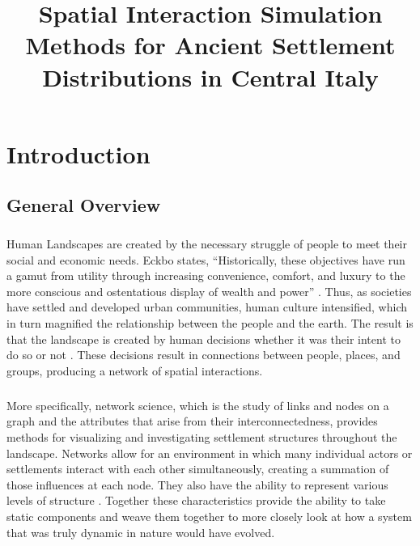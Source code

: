 \documentclass[12pt,a4paper]{thesis}
\begin{document}
\title{Spatial Interaction Simulation Methods for Ancient Settlement Distributions in Central Italy}

\maketitle

\tableofcontents

\listoffigures

\listoftables

\chapter{Introduction}
\section{General Overview}

\paragraph{}
Human Landscapes are created by the necessary struggle of people to meet their social and economic needs.  Eckbo states, ``Historically, these objectives have run a gamut from utility through increasing convenience, comfort, and luxury to the more conscious and ostentatious display of wealth and power'' \citeyearpar[p. 8]{Eckbo69}. Thus, as societies have settled and developed urban communities, human culture intensified, which in turn magnified the relationship between the people and the earth. The result is that the landscape is created by human decisions whether it was their intent to do so or not \citetext{\citealp[3-8]{Eckbo69}; \citealp[161]{AnsWilSch01}}. These decisions result in connections between people, places, and groups, producing a network of spatial interactions. 

\paragraph{}
More specifically, network science, which is the study of links and nodes on a graph and the attributes that arise from their interconnectedness, provides methods for visualizing and investigating settlement structures throughout the landscape. Networks allow for an environment in which many individual actors or settlements interact with each other simultaneously, creating a summation of those influences at each node. They also have the ability to represent various levels of structure \cite[9-10]{KnoKuk92}. Together these characteristics provide the ability to take static components and weave them together to more closely look at how a system that was truly dynamic in nature would have evolved.
\end{document}
